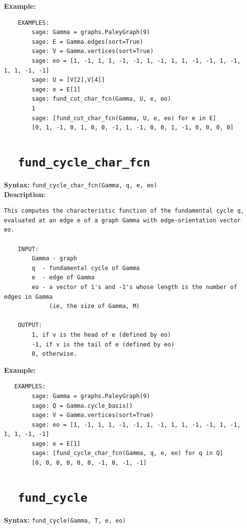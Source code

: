 \documentclass{article}
\begin{document}
\textbf{Example:}
\begin{verbatim}
    EXAMPLES:
        sage: Gamma = graphs.PaleyGraph(9)
        sage: E = Gamma.edges(sort=True)
        sage: V = Gamma.vertices(sort=True)
        sage: eo = [1, -1, 1, 1, -1, -1, 1, -1, 1, 1, -1, -1, 1, -1, 1, 1, -1, -1]
        sage: U = [V[2],V[4]]
        sage: e = E[1]
        sage: fund_cut_char_fcn(Gamma, U, e, eo)
        1
        sage: [fund_cut_char_fcn(Gamma, U, e, eo) for e in E]
        [0, 1, -1, 0, 1, 0, 0, -1, 1, -1, 0, 0, 1, -1, 0, 0, 0, 0]
\end{verbatim}

\section{\tt \ \ fund\_cycle\_char\_fcn}

\textbf{Syntax:} \verb}fund_cycle_char_fcn(Gamma, q, e, eo)}\\

\textbf{Description:}
\begin{verbatim}
This computes the characteristic function of the fundamental cycle q, 
evaluated at an edge e of a graph Gamma with edge-orientation vector eo. 

    INPUT:
        Gamma - graph
        q  - fundamental cycle of Gamma
        e  - edge of Gamma  
        eo - a vector of 1's and -1's whose length is the number of edges in Gamma
             (ie, the size of Gamma, M)

    OUTPUT:
        1, if v is the head of e (defined by eo)
        -1, if v is the tail of e (defined by eo)
        0, otherwise.
\end{verbatim}

\textbf{Example:}
\begin{verbatim}
   EXAMPLES:
        sage: Gamma = graphs.PaleyGraph(9)
        sage: Q = Gamma.cycle_basis()
        sage: V = Gamma.vertices(sort=True)
        sage: eo = [1, -1, 1, 1, -1, -1, 1, -1, 1, 1, -1, -1, 1, -1, 1, 1, -1, -1]
        sage: e = E[1]
        sage: [fund_cycle_char_fcn(Gamma, q, e, eo) for q in Q]
        [0, 0, 0, 0, 0, 0, -1, 0, -1, -1]
\end{verbatim}

\section{\tt \ \ fund\_cycle}
\textbf{Syntax:} \verb}fund_cycle(Gamma, T, e, eo)}\\
\end{document}
